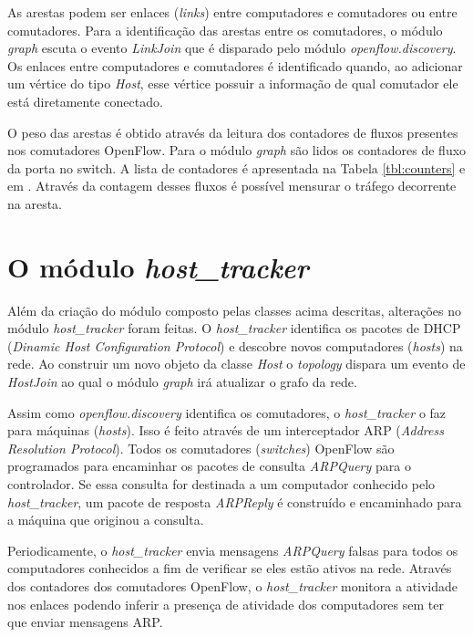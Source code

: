 As arestas podem ser enlaces (\emph{links}) entre computadores e comutadores ou
entre comutadores.
Para a identificação das arestas entre os comutadores, o módulo \emph{graph}
escuta o evento \emph{LinkJoin} que é disparado pelo módulo
\emph{openflow.discovery}.
Os enlaces entre computadores e comutadores é identificado quando, ao
adicionar um vértice do tipo \emph{Host}, esse vértice possuir a informação
de qual comutador ele está diretamente conectado.

O peso das arestas é obtido através da leitura dos contadores de fluxos
presentes nos comutadores OpenFlow.
Para o módulo \emph{graph} são lidos os contadores de fluxo da porta
no switch.
A lista de contadores é apresentada na Tabela \ref{tbl:counters} e em
\citep{ofprotocol2015}.
Através da contagem desses fluxos é possível mensurar o tráfego
decorrente na aresta.



\section{O módulo \emph{host\_tracker}}

Além da criação do módulo composto pelas classes acima descritas, alterações
no módulo \emph{host\_tracker} foram feitas.
O \emph{host\_tracker} identifica os pacotes de DHCP (\emph{Dinamic Host
Configuration Protocol}) e descobre novos computadores (\emph{hosts}) na rede.
Ao construir um novo objeto da classe \emph{Host} o \emph{topology} dispara
um evento de \emph{HostJoin} ao qual o módulo \emph{graph} irá atualizar
o grafo da rede.

Assim como \emph{openflow.discovery} identifica os comutadores, o
\emph{host\_tracker} o faz para máquinas (\emph{hosts}).
Isso é feito através de um interceptador ARP (\emph{Address Resolution
Protocol}).
Todos os comutadores (\emph{switches}) OpenFlow são programados para encaminhar
os pacotes de consulta \emph{ARPQuery} para o controlador.
Se essa consulta for destinada a um computador conhecido pelo
\emph{host\_tracker}, um pacote de resposta \emph{ARPReply} é construído e
encaminhado para a máquina que originou a consulta.

Periodicamente, o \emph{host\_tracker} envia mensagens \emph{ARPQuery} falsas
para todos os computadores conhecidos a fim de verificar se eles estão ativos
na rede.
Através dos contadores dos comutadores OpenFlow, o \emph{host\_tracker}
monitora a atividade nos enlaces podendo inferir a presença de atividade
dos computadores sem ter que enviar mensagens ARP.

